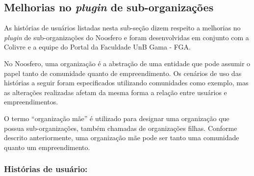 \subsection{Melhorias no \textit{plugin} de sub-organizações}
\label{feature:sub_organizations}

As histórias de usuários listadas nesta sub-seção dizem respeito a melhorias
no \textit{plugin} de sub-organizações do Noosfero e foram desenvolvidas em
conjunto com a Colivre e a equipe do Portal da Faculdade UnB Gama - FGA.

No Noosfero, uma organização é a abstração de uma entidade que pode assumir
o papel tanto de comunidade quanto de empreendimento. Os cenários de uso das
histórias a seguir foram especificados utilizando comunidades como exemplo,
mas as alterações realizadas afetam da mesma forma a relação entre usuários
e empreendimentos.

O termo ``organização mãe'' é utilizado para designar uma organização que
possua sub-organizações, também chamadas de organizações filhas. Conforme
descrito anteriormente, uma organização mãe pode ser tanto uma comunidade quanto um
empreendimento.

\subsubsection*{Histórias de usuário:}

